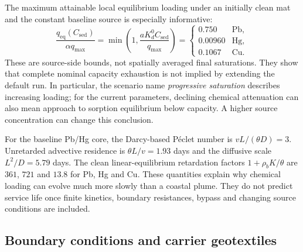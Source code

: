 The maximum attainable local equilibrium loading under an initially clean mat and the constant baseline source is especially informative:
\begin{equation}
 \frac{q_{\mathrm{eq}}(C_{\mathrm{sed}})}{\alpha q_{\max}}
 =\min\!\left(1,\frac{aK_d^0 C_{\mathrm{sed}}}{q_{\max}}\right)
 =\begin{cases}0.750&\mathrm{Pb},\\0.00960&\mathrm{Hg},\\0.1067&\mathrm{Cu}.\end{cases}
 \label{eq:equilibrium_ceiling}
\end{equation}
These are source-side bounds, not spatially averaged final saturations. They show that complete nominal capacity exhaustion is not implied by extending the default run. In particular, the scenario name \emph{progressive saturation} describes increasing loading; for the current parameters, declining chemical attenuation can also mean approach to sorption equilibrium below capacity. A higher source concentration can change this conclusion.

For the baseline Pb/Hg core, the Darcy-based P\'eclet number is $vL/(\theta D)=3$. Unretarded advective residence is $\theta L/v=1.93$ days and the diffusive scale $L^2/D=5.79$ days. The clean linear-equilibrium retardation factors $1+\rho_bK/\theta$ are $361$, $721$ and $13.8$ for Pb, Hg and Cu. These quantities explain why chemical loading can evolve much more slowly than a coastal plume. They do not predict service life once finite kinetics, boundary resistances, bypass and changing source conditions are included.

\subsection{Boundary conditions and carrier geotextiles}
\label{sec:boundary_conditions}

